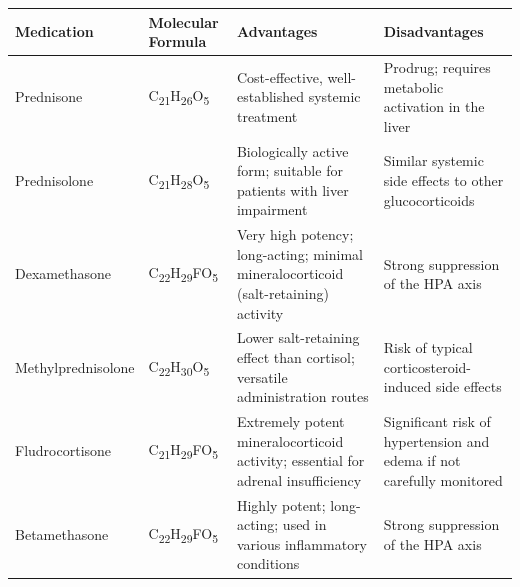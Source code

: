 \documentclass{article}
\begin{document}
\begin{center}
\begin{tabularx}{\textwidth}{|X|X|X|X|}
\hline
Medication & Molecular Formula & Advantages & Disadvantages \\
\hline
Prednisone & C\textsubscript{21}H\textsubscript{26}O\textsubscript{5} & Cost-effective, well-established systemic treatment & Prodrug; requires metabolic activation in the liver \\
\hline
Prednisolone & C\textsubscript{21}H\textsubscript{28}O\textsubscript{5} & Biologically active form; suitable for patients with liver impairment & Similar systemic side effects to other glucocorticoids \\
\hline
Dexamethasone & C\textsubscript{22}H\textsubscript{29}FO\textsubscript{5} & Very high potency; long-acting; minimal mineralocorticoid (salt-retaining) activity & Strong suppression of the HPA axis \\
\hline
Methylprednisolone & C\textsubscript{22}H\textsubscript{30}O\textsubscript{5} & Lower salt-retaining effect than cortisol; versatile administration routes & Risk of typical corticosteroid-induced side effects \\
\hline
Fludrocortisone & C\textsubscript{21}H\textsubscript{29}FO\textsubscript{5} & Extremely potent mineralocorticoid activity; essential for adrenal insufficiency & Significant risk of hypertension and edema if not carefully monitored \\
\hline
Betamethasone & C\textsubscript{22}H\textsubscript{29}FO\textsubscript{5} & Highly potent; long-acting; used in various inflammatory conditions & Strong suppression of the HPA axis \\
\hline
\end{tabularx}
\end{center}
\end{document}
